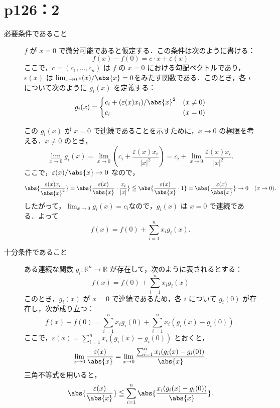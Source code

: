 \section*{p126：2}


\begin{tproof}
  \begin{description}
    \item[必要条件であること]
          $ f $ が $ x=0 $ で微分可能であると仮定する．この条件は次のように書ける：
          \[
            f(x) - f(0) = c \cdot x + \varepsilon(x)
          \]
          ここで，$ c = (c_1, \ldots, c_n) $ は $ f $ の $ x=0 $ における勾配ベクトルであり，$ \varepsilon(x) $ は
          $\lim_{x \to 0} \varepsilon(x)/\abs{x} = 0$をみたす関数である．このとき，各 $ i $ について次のように $ g_i(x) $ を定義する：
          \[
            g_i(x) =
            \begin{cases}
              c_i + (\varepsilon(x) x_i)/\abs{x}^2 & (x \ne 0) \\
              c_i                                  & (x = 0)
            \end{cases}
          \]

          この $ g_i(x) $ が $ x=0 $ で連続であることを示すために，$ x \to 0 $ の極限を考える．$ x \ne 0 $ のとき，
          \[
            \lim_{x \to 0} g_i(x) = \lim_{x \to 0} \left( c_i + \frac{\varepsilon(x) x_i}{|x|^2} \right) = c_i + \lim_{x \to 0} \frac{\varepsilon(x) x_i}{|x|^2}.
          \]
          ここで，$\varepsilon(x)/\abs{x} \to 0 $ なので，
          \[
            \abs{\frac{\varepsilon(x) x_i}{\abs{x}^2}} = \abs{\frac{\varepsilon(x)}{\abs{x}} \cdot \frac{x_i}{|x|}} \leqq  \abs{\frac{\varepsilon(x)}{\abs{x}} \cdot 1} = \abs{\frac{\varepsilon(x)}{\abs{x}}} \to 0 \quad (x \to 0).
          \]
          したがって，$\lim_{x \to 0} g_i(x) = c_i$なので，$ g_i(x) $ は $ x=0 $ で連続である．よって
          \[
            f(x) = f(0) + \sum_{i=1}^n x_i g_i(x).
          \]
    \item [十分条件であること]
          ある連続な関数 $ g_i \colon \mathbb{R}^n \to \mathbb{R} $ が存在して，次のように表されるとする：
          \[
            f(x) = f(0) + \sum_{i=1}^n x_i g_i(x)
          \]
          このとき，$ g_i(x) $ が $ x=0 $ で連続であるため，各 $ i $ について $ g_i(0) $ が存在し，次が成り立つ：
          \[
            f(x) - f(0) = \sum_{i=1}^n x_i g_i(0) + \sum_{i=1}^n x_i (g_i(x) - g_i(0)).
          \]
          ここで，$ \varepsilon(x) = \sum_{i=1}^n x_i (g_i(x) - g_i(0)) $ とおくと，
          \[
            \lim_{x \to 0} \frac{\varepsilon(x)}{\abs{x}} = \lim_{x \to 0} \frac{\sum_{i=1}^n x_i (g_i(x) - g_i(0))}{\abs{x}}.
          \]
          三角不等式を用いると，
          \[
            \abs{ \frac{\varepsilon(x)}{\abs{x}} } \leqq \sum_{i=1}^n \abs{ \frac{x_i(g_i(x) - g_i(0))}{\abs{x}} }.
          \]


\end{description}
\end{tproof}
